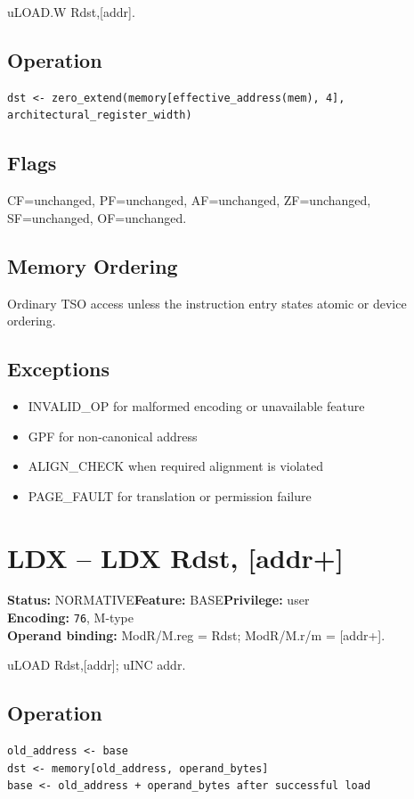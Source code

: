 \documentclass[10pt]{article}
\begin{document}
uLOAD.W Rdst,[addr].

\subsection*{Operation}
\begin{lstlisting}
dst <- zero_extend(memory[effective_address(mem), 4], architectural_register_width)
\end{lstlisting}
\subsection*{Flags}
CF=unchanged, PF=unchanged, AF=unchanged, ZF=unchanged, SF=unchanged, OF=unchanged.
\subsection*{Memory Ordering}
Ordinary TSO access unless the instruction entry states atomic or device ordering.
\subsection*{Exceptions}
\begin{itemize}
\item INVALID\_OP for malformed encoding or unavailable feature
\item GPF for non-canonical address
\item ALIGN\_CHECK when required alignment is violated
\item PAGE\_FAULT for translation or permission failure
\end{itemize}
\clearpage

\section{LDX -- LDX Rdst, [addr+]}
\textbf{Status:} NORMATIVE\quad \textbf{Feature:} BASE\quad \textbf{Privilege:} user\\
\textbf{Encoding:} \texttt{76}, M-type\\
\textbf{Operand binding:} ModR/M.reg = Rdst; ModR/M.r/m = [addr+].

uLOAD Rdst,[addr]; uINC addr.

\subsection*{Operation}
\begin{lstlisting}
old_address <- base
dst <- memory[old_address, operand_bytes]
base <- old_address + operand_bytes after successful load
\end{lstlisting}
\end{document}
